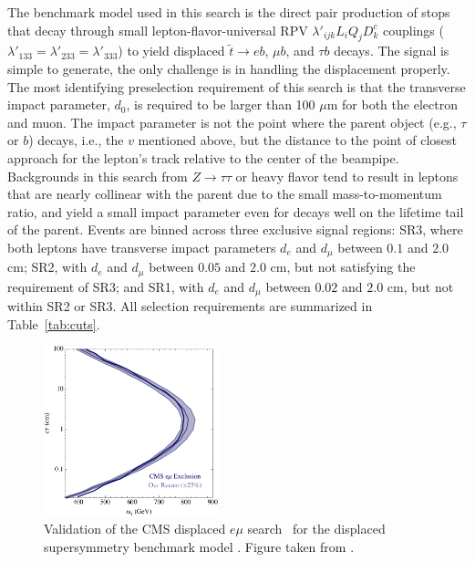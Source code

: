 \vspace{0.5cm}

The benchmark model used in this search is the direct pair production of stops
that decay through small lepton-flavor-universal RPV $\lambda'_{ijk}L_iQ_jD^c_k$
couplings ($\lambda'_{133}=\lambda'_{233}=\lambda'_{333}$) to yield displaced
$\tilde t \to e b$, $\mu b$, and $\tau b$ decays.  The signal is simple to
generate, the only challenge is in handling the displacement properly. The most
identifying preselection requirement of this search is that the transverse
impact parameter, $d_0$, is required to be larger than 100 $\mu$m for both the
electron and muon.  The impact parameter is not the point where the parent
object (e.g., $\tau$ or $b$) decays, i.e., the $v$ mentioned above, but the
distance to the point of closest approach for the lepton's track relative to the
center of the beampipe.  Backgrounds in this search from $Z\to\tau\tau$ or heavy
flavor tend to result in leptons that are nearly collinear with the parent due
to the small mass-to-momentum ratio, and yield a small impact parameter even for
decays well on the lifetime tail of the parent.  Events are binned across three
exclusive signal regions: SR3, where both leptons have transverse impact
parameters $d_e$ and $d_\mu$ between $0.1$ and $2.0$ cm; SR2, with $d_e$ and
$d_\mu$ between $0.05$ and $2.0$ cm, but not satisfying the requirement of SR3;
and SR1, with $d_e$ and $d_\mu$ between $0.02$ and $2.0$ cm, but not within SR2
or SR3.  All selection requirements are summarized in Table~\ref{tab:cuts}.
 
\begin{figure}[ht]
\begin{center}
\includegraphics[width=0.45\textwidth,angle=0]{ch5-figures/emuVal.pdf}
\end{center}
\caption{Validation of the CMS displaced $e\mu$ search~\cite{Khachatryan:2014mea} for
  the displaced supersymmetry benchmark model
  \cite{Graham:2012th}.  Figure taken from \cite{Evans:2016zau}.
}
\label{fig:DTval}
\end{figure}

